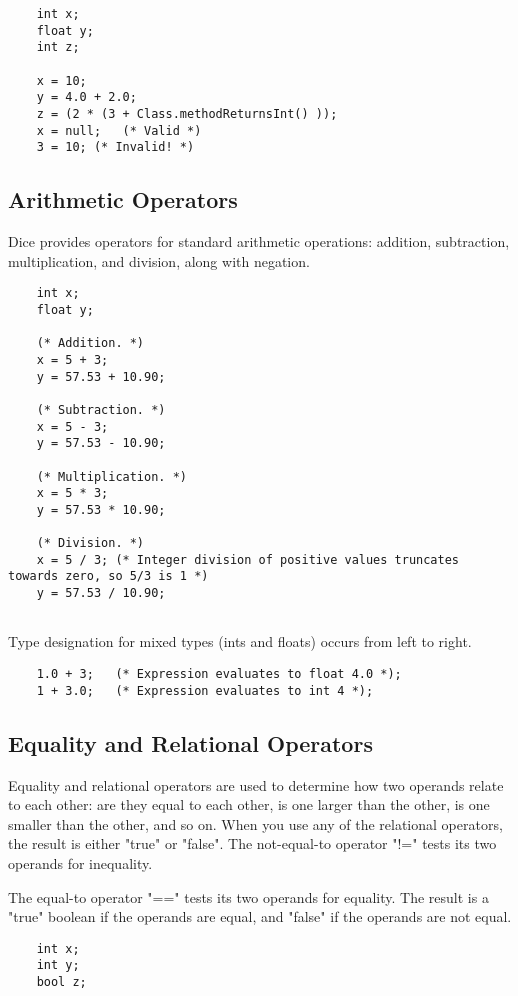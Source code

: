 \begin{homeworkProblem}
	\begin{verbatim}
	int x;
	float y;
	int z;

	x = 10;
	y = 4.0 + 2.0;
	z = (2 * (3 + Class.methodReturnsInt() ));
	x = null;   (* Valid *)
	3 = 10; (* Invalid! *)
	\end{verbatim}
	
	\subsection{Arithmetic Operators}
	
	Dice provides operators for standard arithmetic operations: addition, subtraction, multiplication, and division, along with negation.
	
	\begin{verbatim}
	int x;
	float y;

	(* Addition. *)
	x = 5 + 3;   
	y = 57.53 + 10.90;
	
	(* Subtraction. *)
	x = 5 - 3;
	y = 57.53 - 10.90;
	
	(* Multiplication. *)
	x = 5 * 3;
	y = 57.53 * 10.90;
	
	(* Division. *)
	x = 5 / 3; (* Integer division of positive values truncates towards zero, so 5/3 is 1 *)
	y = 57.53 / 10.90;
	
	\end{verbatim}

	Type designation for mixed types (ints and floats) occurs from left to right.

	\begin{verbatim}
	1.0 + 3;   (* Expression evaluates to float 4.0 *);
	1 + 3.0;   (* Expression evaluates to int 4 *);
	\end{verbatim}
	
	\subsection{Equality and Relational Operators}
	
	Equality and relational operators are used to determine how two operands relate to each other: are they equal to each other, is one larger than the other, is one smaller than the other, and so on. When you use any of the relational operators, the result is either "true" or "false". The not-equal-to operator "!=" tests its two operands for inequality.
	
	The equal-to operator "==" tests its two operands for equality. The result is a "true" boolean if the operands are equal, and "false" if the operands are not equal.
	\begin{verbatim}
	int x;
	int y;
	bool z;


\end{verbatim}
\end{homeworkProblem}
